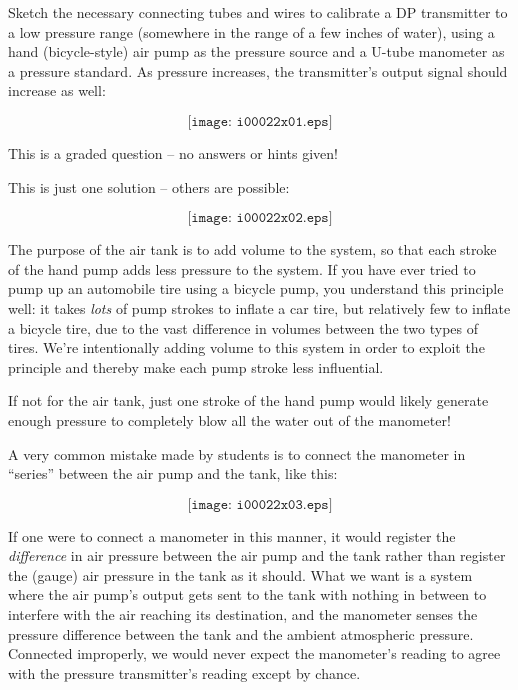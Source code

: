 

Sketch the necessary connecting tubes and wires to calibrate a DP transmitter to a low pressure range (somewhere in the range of a few inches of water), using a hand (bicycle-style) air pump as the pressure source and a U-tube manometer as a pressure standard.  As pressure increases, the transmitter's output signal should increase as well:

$$\texttt{[image: i00022x01.eps]}$$

\vfil 

\eject






This is a graded question -- no answers or hints given!







This is just one solution -- others are possible:

$$\texttt{[image: i00022x02.eps]}$$

The purpose of the air tank is to add volume to the system, so that each stroke of the hand pump adds less pressure to the system.  If you have ever tried to pump up an automobile tire using a bicycle pump, you understand this principle well: it takes {\it lots} of pump strokes to inflate a car tire, but relatively few to inflate a bicycle tire, due to the vast difference in volumes between the two types of tires.  We're intentionally adding volume to this system in order to exploit the principle and thereby make each pump stroke less influential.  

If not for the air tank, just one stroke of the hand pump would likely generate enough pressure to completely blow all the water out of the manometer!

\vfil \eject

A very common mistake made by students is to connect the manometer in ``series'' between the air pump and the tank, like this:

$$\texttt{[image: i00022x03.eps]}$$

If one were to connect a manometer in this manner, it would register the {\it difference} in air pressure between the air pump and the tank rather than register the (gauge) air pressure in the tank as it should.  What we want is a system where the air pump's output gets sent to the tank with nothing in between to interfere with the air reaching its destination, and the manometer senses the pressure difference between the tank and the ambient atmospheric pressure.  Connected improperly, we would never expect the manometer's reading to agree with the pressure transmitter's reading except by chance.

